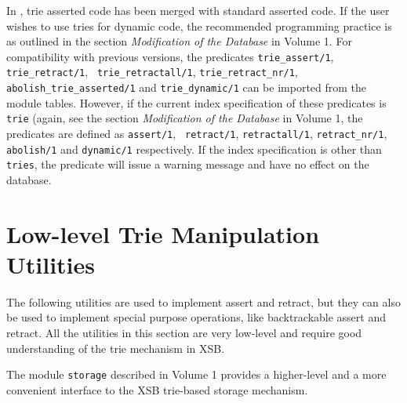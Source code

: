 
In \version, trie asserted code has been merged with standard asserted
code.  If the user wishes to use tries for dynamic code, the
recommended programming practice is as outlined in the section {\it
Modification of the Database} in Volume 1.
For compatibility with previous versions, the
predicates {\tt trie\_assert/1}, {\tt trie\_retract/1}, {\tt
trie\_retractall/1}, {\tt trie\_retract\_nr/1}, {\tt
abolish\_trie\_asserted/1} and {\tt trie\_dynamic/1} can be imported
from the module {\sf tables}.  However, if the current index
specification of these predicates is {\tt trie} (again, see the
section {\it Modification of the Database} in Volume 1, the predicates
are defined as {\tt assert/1}, {\tt 
retract/1}, {\tt retractall/1}, {\tt retract\_nr/1}, {\tt abolish/1}
and {\tt dynamic/1} respectively.  If the index specification is other
than {\tt tries}, the predicate will issue a warning message and have
no effect on the database.

\section{Low-level Trie Manipulation Utilities}

The following utilities are used to implement assert and retract, but they
can also be used to implement special purpose operations, like
backtrackable assert and retract. All the utilities in this section are
very low-level and require good understanding of the trie mechanism in XSB.

The module {\tt storage} described in Volume 1 provides a higher-level and
a more convenient interface to the XSB trie-based storage mechanism.

